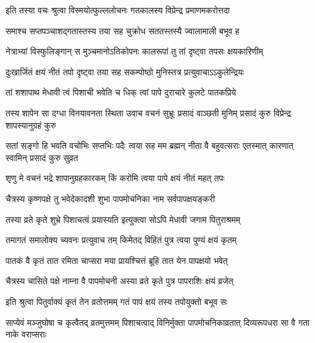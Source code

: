 \twolineshloka
{इति तस्या वचः श्रुत्वा विस्मयोत्फुल्ललोचनः}
{गतकालस्य विप्रेन्द्र प्रमाणमकरोत्तदा}%

\twolineshloka
{समाश्च सप्तपञ्चाशद्गतास्तस्य तया सह}
{चुक्रोध सततस्तस्यै ज्वालामाली बभूव ह}%

\twolineshloka
{नेत्राभ्यां विस्फुलिङ्गान् स मुञ्चमानोऽतिकोपनः}
{कालरूपां तु तां दृष्ट्वा तपसः क्षयकारिणीम्}%

\twolineshloka
{दुःखार्जितं क्षयं नीतं तपो दृष्ट्वा तया सह}
{सकम्पोष्ठो मुनिस्तत्र प्रत्युवाचाऽऽकुलेन्द्रियः}%

\twolineshloka
{तां शशापाथ मेधावी त्वं पिशाची भवेति च}
{धिक् त्वां पापे दुराचारे कुलटे पातकप्रिये}%

\threelineshloka
{तस्य शापेन सा दग्धा विनयावनता स्थिता}
{उवाच वचनं सुभ्रूः प्रसादं वाञ्छती मुनिम्}
{प्रसादं कुरु विप्रेन्द्र शापस्यानुग्रहं कुरु}%

\threelineshloka
{सतां सङ्गो हि भवति वचोभिः सप्तभिः पदैः}
{त्वया सह मम ब्रह्मन् नीता वै बहुवत्सराः}
{एतस्मात् कारणात् स्वामिन् प्रसादं कुरु सुव्रत}%


\twolineshloka
{शृणु मे वचनं भद्रे शापानुग्रहकारकम्}
{किं करोमि त्वया पापे क्षयं नीतं महत् तपः}%

\twolineshloka
{चैत्रस्य कृष्णपक्षे तु भवेदेकादशी शुभा}
{पापमोचनिका नाम सर्वपापक्षयङ्करी}%

\twolineshloka
{तस्या व्रते कृते शुभ्रे पिशाचत्वं प्रयास्यति}
{इत्युक्त्वा सोऽपि मेधावी जगाम पितुराश्रमम्}%

\twolineshloka
{तमागतं समालोक्य च्यवनः प्रत्युवाच तम्}
{किमेतद् विहितं पुत्र त्वया पुण्यं क्षयं कृतम्}%


\twolineshloka
{पातकं वै कृतं तात रमिता चाप्सरा मया}
{प्रायश्चित्तं ब्रूहि तात येन पापक्षयो भवेत्}%


\twolineshloka
{चैत्रस्य चासिते पक्षे नाम्ना वै पापमोचनी}
{अस्या व्रते कृते पुत्र पापराशिः क्षयं व्रजेत्}%

\twolineshloka
{इति श्रुत्वा पितुर्वाक्यं कृतं तेन व्रतोत्तमम्}
{गतं पापं क्षयं तस्य तपोयुक्तो बभूव सः}%

\threelineshloka
{साप्येवं मञ्जुघोषा च कृत्वैतद् व्रतमुत्तमम्}
{पिशाचत्वाद् विनिर्मुक्ता पापमोचनिकाव्रतात्}
{दिव्यरूपधरा सा वै गता नाके वराप्सराः}%


